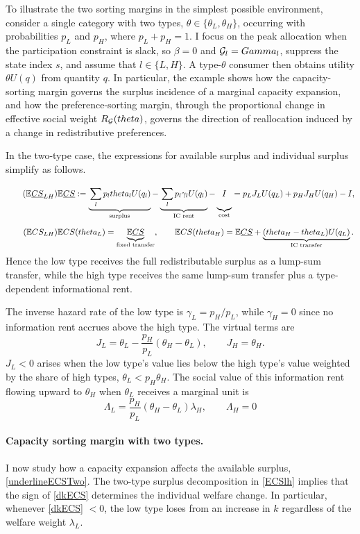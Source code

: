 \documentclass{class}
\begin{document}
To illustrate the two sorting margins in the simplest possible environment, consider a single category with two types, $\theta\in\{\theta_L,\theta_H\}$, occurring with probabilities $p_L$ and $p_H$, where $p_L+p_H=1$. I focus on the peak allocation when the participation constraint is slack, so $\beta=0$ and $\mathcal{G}_l = Gamma_l$, suppress the state index $s$, and assume that $l\in\{L,H\}$. A type-$\theta$ consumer then obtains utility $\theta U(q)$ from quantity $q$. In particular, the example shows how the capacity-sorting margin governs the surplus incidence of a marginal capacity expansion, and how the preference-sorting margin, through the proportional change in effective social weight $R_{\mathcal{G}}(theta)$, governs the direction of reallocation induced by a change in redistributive preferences.

In the two-type case, the expressions for available surplus and individual surplus simplify as follows.
\[\tag{$\E \underline{CS}_{LH}$}\label{underlineECSTwo}
\E \underline{CS} := \underbrace{\Bigg.\sum_l p_l \theta_l U(q_l)\Bigg.}_{\text{surplus}} -  \underbrace{\Bigg.\sum_l p_l \gamma_l U(q_l)\Bigg.}_{\text{IC rent}} - \underbrace{\Bigg.I\Bigg.}_{\text{cost}} = p_L J_L U(q_L) + p_H J_H U(q_H)  - I,
\]
\[
\tag{$\E CS_{LH}$}\label{ECSlh} \E CS(\theta_L) = \underbrace{\E \underline{CS}}_{\text{fixed transfer}}, \qquad \E CS(\theta_H) = \E \underline{CS} + \underbrace{(\theta_H - \theta_L)U(q_L)}_{\text{IC transfer}}.
\] 
Hence the low type receives the full redistributable surplus as a lump-sum transfer, while the high type receives the same lump-sum transfer plus a type-dependent informational rent.

The inverse hazard rate of the low type is $\gamma_L = p_H/p_L$, while $\gamma_H = 0$ since no information rent accrues above the high type. The virtual terms are \[J_L = \theta_L - \frac{p_H}{p_L}(\theta_H-\theta_L), \qquad J_H = \theta_H.\] $J_L < 0$ arises when the low type's value lies below the high type's value weighted by the share of high types, $\theta_L < p_H \theta_H$. The social value of this information rent flowing upward to $\theta_H$ when $\theta_L$ receives a marginal unit is \[\Lambda_L = \frac{p_H}{p_L}(\theta_H-\theta_L)\lambda_H, \qquad \Lambda_H = 0\] 

\paragraph{Capacity sorting margin with two types.} I now study how a capacity expansion affects the available surplus, \ref{underlineECSTwo}. The two-type surplus decomposition in \ref{ECSlh} implies that the sign of \ref{dkECS} determines the individual welfare change. In particular, whenever \ref{dkECS} $< 0$, the low type loses from an increase in $k$ regardless of the welfare weight $\lambda_L$.
\end{document}
